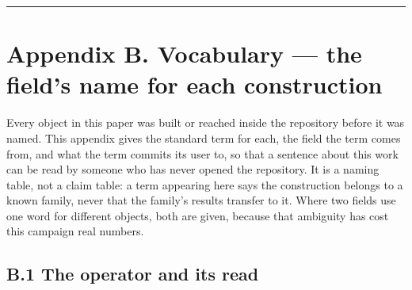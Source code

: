 \documentclass[11pt,a4paper]{article}
\theoremstyle{plain}
\theoremstyle{definition}
\theoremstyle{remark}
\begin{document}
\begin{center}\rule{0.5\linewidth}{0.5pt}\end{center}

\section{Appendix B. Vocabulary --- the field's name for each
construction}\label{appendix-b.-vocabulary-the-fields-name-for-each-construction}

Every object in this paper was built or reached inside the repository
before it was named. This appendix gives the standard term for each, the
field the term comes from, and what the term commits its user to, so
that a sentence about this work can be read by someone who has never
opened the repository. It is a naming table, not a claim table: a term
appearing here says the construction belongs to a known family, never
that the family's results transfer to it. Where two fields use one word
for different objects, both are given, because that ambiguity has cost
this campaign real numbers.

\subsection{B.1 The operator and its
read}\label{b.1-the-operator-and-its-read}
\end{document}
